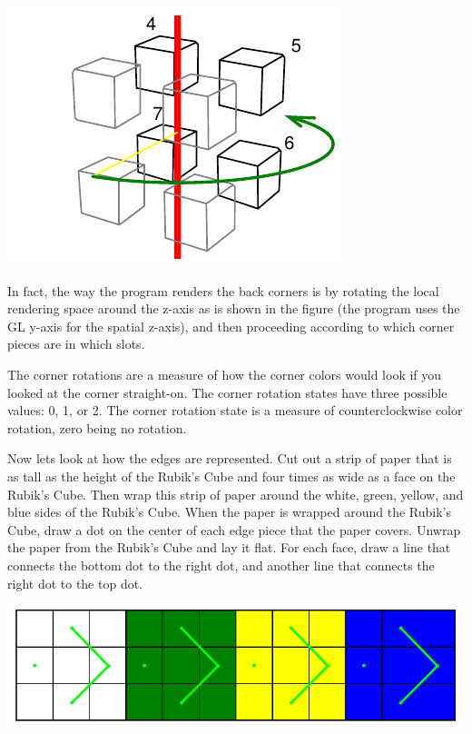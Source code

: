 \documentclass{article}
\begin{document}
\begin{center}
\includegraphics{image2}
\end{center}

In fact, the way the program renders the back corners is by rotating
the local rendering space around the z-axis as is shown in the figure
(the program uses the GL y-axis for the spatial z-axis), and then
proceeding according to which corner pieces are in which slots.

The corner rotations are a measure of how the corner colors would look
if you looked at the corner straight-on. The corner rotation states
have three possible values: 0, 1, or 2. The corner rotation state is a
measure of counterclockwise color rotation, zero being no rotation.

Now lets look at how the edges are represented. Cut out a strip of
paper that is as tall as the height of the Rubik's Cube and four times
as wide as a face on the Rubik's Cube. Then wrap this strip of paper
around the white, green, yellow, and blue sides of the Rubik's
Cube. When the paper is wrapped around the Rubik's Cube, draw a dot on
the center of each edge piece that the paper covers. Unwrap the paper
from the Rubik's Cube and lay it flat. For each face, draw a line that
connects the bottom dot to the right dot, and another line that
connects the right dot to the top dot.

\begin{center}
\includegraphics{image3}
\end{center}
\end{document}
